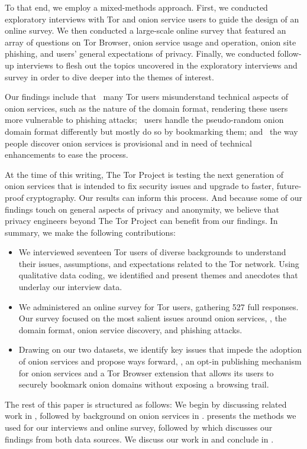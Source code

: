 To that end, we employ a mixed-methods approach. First, we conducted exploratory interviews with Tor and onion service users to guide the design of an online survey. We then conducted a large-scale online survey that featured an array of questions on Tor Browser, onion service usage and operation, onion site
phishing, and users' general expectations of privacy. Finally, we conducted follow-up interviews to flesh out the topics uncovered in the exploratory interviews and survey in order to dive deeper into the themes of interest.

Our findings include that \first~many Tor users misunderstand technical aspects
of onion services, such as the nature of the domain format, rendering these users
more vulnerable to phishing attacks; \second~users handle the pseudo-random
onion domain format differently but mostly do so by bookmarking them; and \third~the
way people discover onion services is provisional and in need of technical
enhancements to ease the process.

At the time of this writing, The Tor Project is testing the next generation of
onion services that is intended to fix security issues and upgrade to faster, 
future-proof cryptography.  Our results can inform this process.
And because some of our findings touch on general aspects of privacy and
anonymity, we believe that privacy engineers beyond The Tor Project can benefit
from our findings.  In summary, we make the following contributions:

\begin{itemize}
    \item We interviewed seventeen Tor users of diverse backgrounds to
        understand their issues, assumptions, and expectations related to the
        Tor network.  Using qualitative data coding, we identified and present
        themes and anecdotes that underlay our interview data.

    \item We administered an online survey for Tor users, gathering 527 full
        responses.  Our survey focused on the most salient issues around onion
        services, \ie, the domain format, onion service discovery, and phishing
        attacks.

    \item Drawing on our two datasets, we identify key issues that impede the
        adoption of onion services and propose ways forward, \eg, an opt-in
        publishing mechanism for onion services and a Tor Browser extension
        that allows its users to securely bookmark onion domains without
        exposing a browsing trail.
\end{itemize}

The rest of this paper is structured as follows:  We begin by discussing related
work in , followed by background on onion services in
.   presents the methods we used for
our interviews and online survey, followed by  which discusses
our findings from both data sources.  We discuss our work in
 and conclude in .
